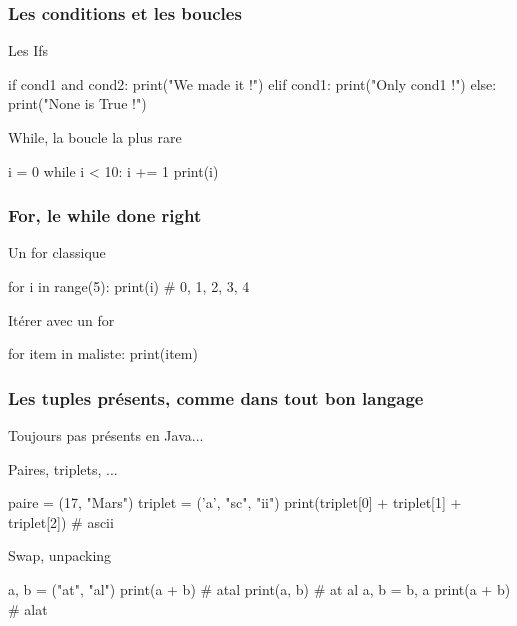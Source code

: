 \documentclass{beamer}
\begin{document}
\begin{frame}[fragile]
  \frametitle{Les conditions et les boucles}

  \begin{block}{Les Ifs}
    \begin{python}
if cond1 and cond2:
  print("We made it !")
elif cond1:
  print("Only cond1 !")
else:
  print("None is True !")
    \end{python}
  \end{block}

  \begin{block}{While, la boucle la plus rare}
    \begin{python}
i = 0
while i < 10:
  i += 1
  print(i)
    \end{python}
  \end{block}

\end{frame}


\begin{frame}[fragile]
  \frametitle{For, le while done right}

  \begin{block}{Un for classique}
    \begin{python}
for i in range(5):
  print(i) # 0, 1, 2, 3, 4
    \end{python}
  \end{block}


  \begin{block}{Itérer avec un for}
    \begin{python}
for item in maliste:
  print(item)
    \end{python}
  \end{block}

\end{frame}

\begin{frame}[fragile]
  \frametitle{Les tuples présents, comme dans tout bon langage}

  \centering

  Toujours pas présents en Java...

  \begin{block}{Paires, triplets, ...}
    \begin{python}
paire = (17, "Mars")
triplet = ('a', "sc", "ii")
print(triplet[0] + triplet[1] + triplet[2])
# ascii
    \end{python}
  \end{block}

  \begin{block}{Swap, unpacking}
    \begin{python}
a, b = ("at", "al")
print(a + b) # atal
print(a, b) # at al
a, b = b, a
print(a + b) # alat
    \end{python}
  \end{block}

\end{frame}
\end{document}
